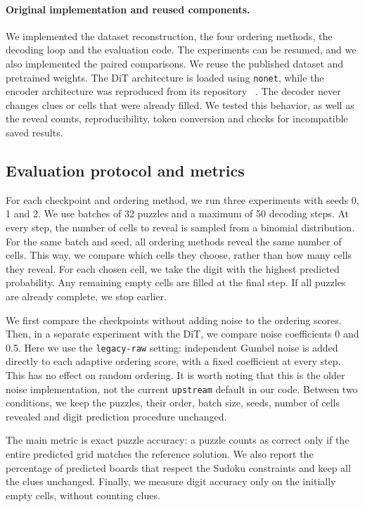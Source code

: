 \documentclass{article}
\begin{document}
\paragraph{Original implementation and reused components.}
We implemented the dataset reconstruction, the four ordering methods, the
decoding loop and the evaluation code. The experiments can be resumed, and we
also implemented the paired comparisons. We reuse the published dataset and
pretrained weights. The DiT architecture is loaded using \texttt{nonet}, while
the encoder architecture was reproduced from its repository
~\citep{sudokuDiT,sudokuEncoder}. The decoder never changes clues or cells
that were already filled. We tested this behavior, as well as the reveal
counts, reproducibility, token conversion and checks for incompatible saved
results.

\subsection{Evaluation protocol and metrics}
For each checkpoint and ordering method, we run three experiments with seeds
0, 1 and 2. We use batches of 32 puzzles and a maximum of 50 decoding steps.
At every step, the number of cells to reveal is sampled from a binomial
distribution. For the same batch and seed, all ordering methods reveal the
same number of cells. This way, we compare which cells they choose, rather
than how many cells they reveal. For each chosen cell, we take the digit with
the highest predicted probability. Any remaining empty cells are filled at
the final step. If all puzzles are already complete, we stop earlier.

We first compare the checkpoints without adding noise to the ordering scores.
Then, in a separate experiment with the DiT, we compare noise coefficients
0 and 0.5. Here we use the \texttt{legacy-raw} setting: independent Gumbel
noise is added directly to each adaptive ordering score, with a fixed
coefficient at every step. This has no effect on random ordering. It is worth
noting that this is the older noise implementation, not the current
\texttt{upstream} default in our code. Between two conditions, we keep the
puzzles, their order, batch size, seeds, number of cells revealed and digit
prediction procedure unchanged.

The main metric is exact puzzle accuracy: a puzzle counts as correct only if
the entire predicted grid matches the reference solution. We also report the
percentage of predicted boards that respect the Sudoku constraints and keep
all the clues unchanged. Finally, we measure digit accuracy only on the
initially empty cells, without counting clues.
\end{document}
